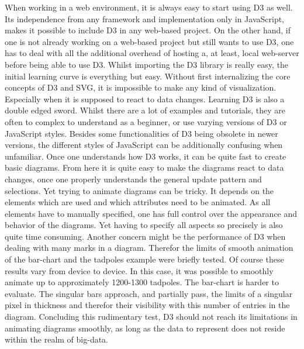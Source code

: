 When working in a web environment, it is always easy to start using D3 as well. Its independence from any framework and implementation only in JavaScript, makes it possible to include D3 in any web-based project. On the other hand, if one is not already working on a web-based project but still wants to use D3, one has to deal with all the additional overhead of hosting a, at least, local web-server before being able to use D3. Whilst importing the D3 library is really easy, the initial learning curve is everything but easy. Without first internalizing the core concepts of D3 and SVG, it is impossible to make any kind of visualization. Especially when it is supposed to react to data changes. Learning D3 is also a double edged sword. Whilst there are a lot of examples and tutorials, they are often to complex to understand as a beginner, or use varying versions of D3 or JavaScript styles. Besides some functionalities of D3 being obsolete in newer versions, the different styles of JavaScript can be additionally confusing when unfamiliar. Once one understands how D3 works, it can be quite fast to create basic diagrams. From here it is quite easy to make the diagrams react to data changes, once one properly understands the general update pattern and selections. Yet trying to animate diagrams can be tricky. It depends on the elements which are used and which attributes need to be animated. As all elements have to manually specified, one has full control over the appearance and behavior of the diagrams. Yet having to specify all aspects so precisely is also quite time consuming. Another concern might be the performance of D3 when dealing with many marks in a diagram. Therefor the limits of smooth animation of the bar-chart and the tadpoles example\cite{bostock_2020} were briefly tested. Of course these results vary from device to device. In this case, it was possible to smoothly animate up to approximately 1200-1300 tadpoles. The bar-chart is harder to evaluate. The singular bars approach, and partially pass, the limits of a singular pixel in thickness and therefor their visibility with this number of entries in the diagram. Concluding this rudimentary test, D3 should not reach its limitations in animating diagrams smoothly, as long as the data to represent does not reside within the realm of big-data.

